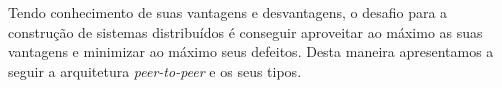 Tendo conhecimento de suas vantagens e desvantagens, o desafio para a construção de sistemas distribuídos é conseguir aproveitar ao máximo as suas vantagens e minimizar ao máximo seus defeitos. Desta maneira apresentamos a seguir a arquitetura \textit{peer-to-peer} e os seus tipos.




